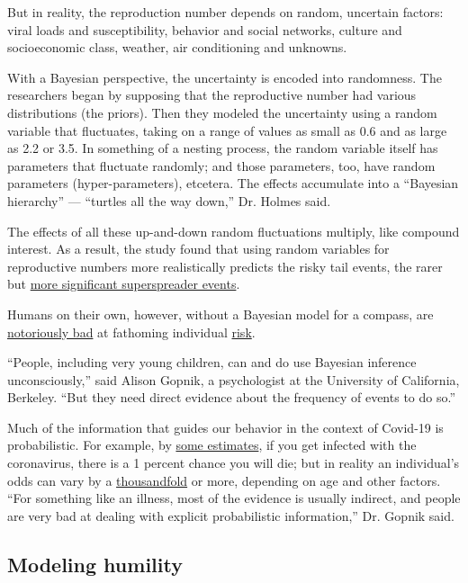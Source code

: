 But in reality, the reproduction number depends on random, uncertain
factors: viral loads and susceptibility, behavior and social networks,
culture and socioeconomic class, weather, air conditioning and unknowns.

With a Bayesian perspective, the uncertainty is encoded into randomness.
The researchers began by supposing that the reproductive number had
various distributions (the priors). Then they modeled the uncertainty
using a random variable that fluctuates, taking on a range of values as
small as 0.6 and as large as 2.2 or 3.5. In something of a nesting
process, the random variable itself has parameters that fluctuate
randomly; and those parameters, too, have random parameters
(hyper-parameters), etcetera. The effects accumulate into a ``Bayesian
hierarchy'' --- ``turtles all the way down,'' Dr. Holmes said.

The effects of all these up-and-down random fluctuations multiply, like
compound interest. As a result, the study found that using random
variables for reproductive numbers more realistically predicts the risky
tail events, the rarer but
\href{https://www.nytimes3xbfgragh.onion/2020/06/30/science/how-coronavirus-spreads.html}{more
significant superspreader events}.

Humans on their own, however, without a Bayesian model for a compass,
are \href{https://en.wikipedia.org/wiki/Prospect_theory}{notoriously
bad} at fathoming individual
\href{https://twitter.com/xkcdComic/status/1283437923421937666/photo/1}{risk}.

``People, including very young children, can and do use Bayesian
inference unconsciously,'' said Alison Gopnik, a psychologist at the
University of California, Berkeley. ``But they need direct evidence
about the frequency of events to do so.''

Much of the information that guides our behavior in the context of
Covid-19 is probabilistic. For example, by
\href{https://www.nature.com/articles/d41586-020-01738-2}{some
estimates}, if you get infected with the coronavirus, there is a 1
percent chance you will die; but in reality an individual's odds can
vary by a
\href{https://medium.com/wintoncentre/how-much-normal-risk-does-covid-represent-4539118e1196}{thousandfold}
or more, depending on age and other factors. ``For something like an
illness, most of the evidence is usually indirect, and people are very
bad at dealing with explicit probabilistic information,'' Dr. Gopnik
said.

\hypertarget{modeling-humility}{%
\subsection{Modeling humility}\label{modeling-humility}}

